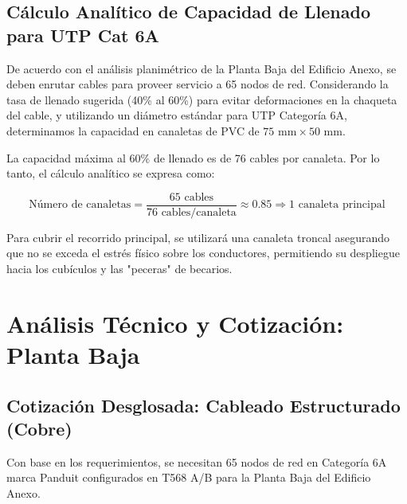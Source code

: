 \documentclass[11pt, letterpaper]{article}
\begin{document}
\subsection{Cálculo Analítico de Capacidad de Llenado para UTP Cat 6A}
De acuerdo con el análisis planimétrico de la Planta Baja del Edificio Anexo, se deben enrutar cables para proveer servicio a 65 nodos de red. Considerando la tasa de llenado sugerida (40\% al 60\%) para evitar deformaciones en la chaqueta del cable, y utilizando un diámetro estándar para UTP Categoría 6A, determinamos la capacidad en canaletas de PVC de $75 \text{ mm} \times 50 \text{ mm}$.

La capacidad máxima al 60\% de llenado es de 76 cables por canaleta. Por lo tanto, el cálculo analítico se expresa como:

\begin{equation}
\text{Número de canaletas} = \frac{65 \text{ cables}}{76 \text{ cables/canaleta}} \approx 0.85 \Rightarrow 1 \text{ canaleta principal}
\end{equation}

Para cubrir el recorrido principal, se utilizará una canaleta troncal asegurando que no se exceda el estrés físico sobre los conductores, permitiendo su despliegue hacia los cubículos y las "peceras" de becarios.

\section{Análisis Técnico y Cotización: Planta Baja}

\subsection{Cotización Desglosada: Cableado Estructurado (Cobre)}
Con base en los requerimientos, se necesitan 65 nodos de red en Categoría 6A marca Panduit configurados en T568 A/B para la Planta Baja del Edificio Anexo.
\end{document}
